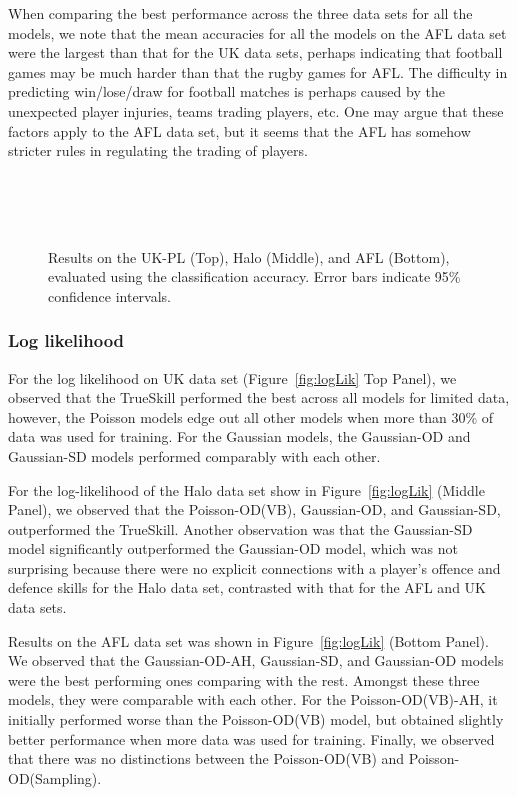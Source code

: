 When comparing the best performance across the three data sets for all the models, we note that the mean accuracies for all the models on the AFL data set were the largest than that for the UK data sets, perhaps indicating that football games may be much harder than that the rugby games for AFL. The difficulty in predicting win/lose/draw for football matches is perhaps caused by the unexpected player injuries, teams trading players, etc. One may argue that these factors apply to the AFL data set, but it seems that the AFL has somehow stricter rules in regulating the trading of players. 

\begin{center}
\begin{figure}[htbp!]
 \centering
 \\
\\
\\
\caption{\small Results on the UK-PL (Top), Halo (Middle), and AFL (Bottom), evaluated
using the classification accuracy. Error bars indicate
95\% confidence intervals.}
\label{fig:accuracyWLD}
\end{figure}
\end{center}

\subsubsection{Log likelihood}
For the log likelihood on UK data set (Figure~\ref{fig:logLik} Top Panel), we observed that the TrueSkill performed the best across all models for limited data, however, the Poisson models edge out all other models when more than 30\% of data was used for training. For the Gaussian models, the Gaussian-OD and Gaussian-SD models performed comparably with each other. 

For the log-likelihood of the Halo data set show in Figure~\ref{fig:logLik} (Middle Panel), we observed that the Poisson-OD(VB), Gaussian-OD, and Gaussian-SD, outperformed the TrueSkill. Another observation was that the Gaussian-SD model significantly outperformed the Gaussian-OD model, which was not surprising because there were no explicit connections with a player's offence and defence skills for the Halo data set, contrasted with that for the AFL and UK data sets. 

Results on the AFL data set was shown in Figure~\ref{fig:logLik} (Bottom Panel). We observed that the Gaussian-OD-AH, Gaussian-SD, and Gaussian-OD models were the best performing ones comparing with the rest. Amongst these three models, they were comparable with each other. For the Poisson-OD(VB)-AH, it initially performed worse than the Poisson-OD(VB) model, but obtained slightly better performance when more data was used for training. Finally, we observed that there was no distinctions between the Poisson-OD(VB) and Poisson-OD(Sampling). 

